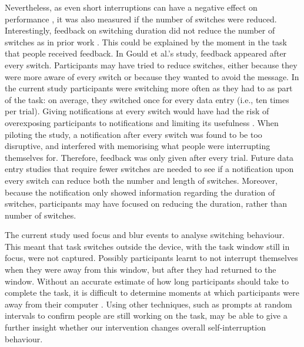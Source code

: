 Nevertheless, as even short interruptions can have a negative effect on performance \citep{Altmann2014}, it was also measured if the number of switches were reduced. Interestingly, feedback on switching duration did not reduce the number of switches as in prior work \citep{Gould2016a}. This could be explained by the moment in the task that people received feedback. In Gould et al.'s study, feedback appeared after every switch. Participants may have tried to reduce switches, either because they were more aware of every switch or because they wanted to avoid the message. In the current study participants were switching more often as they had to as part of the task: on average, they switched once for every data entry (i.e., ten times per trial). Giving notifications at every switch would have had the risk of overexposing participants to notifications and limiting its usefulness \citep{Cutrell2001, Whittaker2016}. When piloting the study, a notification after every switch was found to be too disruptive, and interfered with memorising what people were interrupting themselves for. Therefore, feedback was only given after every trial. Future data entry studies that require fewer switches are needed to see if a notification upon every switch can reduce both the number and length of switches. Moreover, because the notification only showed information regarding the duration of switches, participants may have focused on reducing the duration, rather than number of switches. 

The current study used focus and blur events to analyse switching behaviour. This meant that task switches outside the device, with the task window still in focus, were not captured. Possibly participants learnt to not interrupt themselves when they were away from this window, but after they had returned to the window. Without an accurate estimate of how long participants should take to complete the task, it is difficult to determine moments at which participants were away from their computer \citep{Rzeszotarski2013}.  Using other techniques, such as prompts at random intervals to confirm people are still working on the task, may be able to give a further insight whether our intervention changes overall self-interruption behaviour. 

